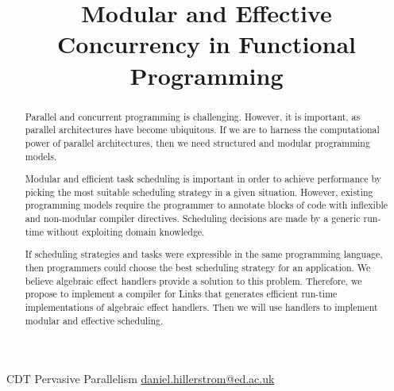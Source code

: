 \documentclass[preprint,10pt,numbers]{sigplanconf}
\begin{document}
\title{Modular and Effective Concurrency in Functional Programming}

           {CDT Pervasive Parallelism}
           {\href{mailto:daniel.hillerstrom@ed.ac.uk}{daniel.hillerstrom@ed.ac.uk}}
  \maketitle
  \begin{abstract}
Parallel and concurrent programming is challenging. However, it is important, as parallel architectures have become ubiquitous. If we are to harness the computational power of parallel architectures, then we need structured and modular programming models.

Modular and efficient task scheduling is important in order to achieve performance by picking the most suitable scheduling strategy in a given situation. However, existing programming models require the programmer to annotate blocks of code with inflexible and non-modular compiler directives. Scheduling decisions are made by a generic run-time without exploiting domain knowledge.

If scheduling strategies and tasks were expressible in the same programming language, then programmers could choose the best scheduling strategy for an application. We believe algebraic effect handlers provide a solution to this problem. Therefore, we propose to implement a compiler for Links that generates efficient run-time implementations of algebraic effect handlers. Then we will use handlers to implement modular and effective scheduling.
  \end{abstract}
  \raggedbottom
\end{document}
